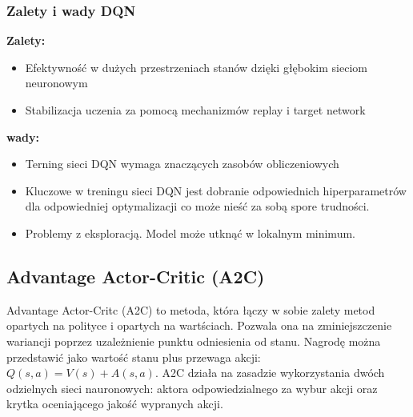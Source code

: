 \documentclass[a4paper, 12pt]{article}
\begin{document}
    \subsubsection{Zalety i wady DQN}
    \noindent \textbf{Zalety:}
    \begin{itemize}
        \item Efektywność w dużych przestrzeniach stanów dzięki głębokim sieciom neuronowym
        \item Stabilizacja uczenia za pomocą mechanizmów replay i target network
    \end{itemize}
    \textbf{wady:}
    \begin{itemize}
        \item Terning sieci DQN wymaga znaczących zasobów obliczeniowych
        \item Kluczowe w treningu sieci DQN jest dobranie odpowiednich hiperparametrów dla odpowiedniej optymalizacji
        co może nieść za sobą spore trudności.
        \item Problemy z eksploracją. Model może utknąć w lokalnym minimum.
    \end{itemize}
    \subsection{Advantage Actor-Critic (A2C)}
    Advantage Actor-Critc (A2C) to metoda, która łączy w sobie zalety metod opartych na polityce i opartych na wartściach.
    Pozwala ona na zminiejszczenie wariancji poprzez uzależnienie punktu odniesienia od stanu. Nagrodę można przedstawić
    jako wartość stanu plus przewaga akcji: \( Q(s,a) = V(s) + A(s,a) \). A2C działa na zasadzie wykorzystania dwóch odzielnych
    sieci nauronowych: aktora odpowiedzialnego za wybur akcji oraz krytka oceniającego jakość wypranych akcji.
\end{document}
